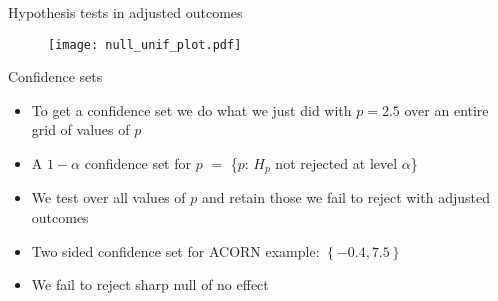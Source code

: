 \documentclass[table, xcolor = {dvipsnames}, 9pt]{beamer}
\theoremstyle{plain}
\begin{document}
\begin{frame}{Hypothesis tests in adjusted outcomes}
\begin{figure}[H]
\texttt{[image: null\_unif\_plot.pdf]}
\end{figure}
\end{frame}
\begin{frame}{Confidence sets}
\vfill
\begin{itemize} \vfill
\item To get a confidence set we do what we just did with $p = 2.5$ over an entire grid of values of $p$ \vfill
\item A $1-\alpha$ confidence set for $p$ $= $ \{$p$: $H_{p}$ not rejected at level $\alpha$\} \vfill
\item We test over all values of $p$ and retain those we fail to reject with adjusted outcomes \vfill
\item Two sided confidence set for ACORN example: $\left\{-0.4, 7.5\right\}$ \vfill
\item We fail to reject sharp null of no effect \vfill
\end{itemize}
\end{frame}
\end{document}
